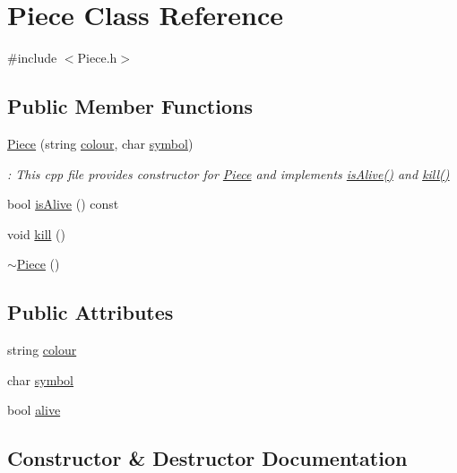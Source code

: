 \hypertarget{classPiece}{}\section{Piece Class Reference}
\label{classPiece}


{\ttfamily \#include $<$Piece.\+h$>$}

\subsection*{Public Member Functions}
\begin{DoxyCompactItemize}
\item 
\hyperlink{classPiece_ad9009085b915df6c20503f2ce144c931}{Piece} (string \hyperlink{classPiece_aa789cfb1749a0dc7ae40c20e369a4321}{colour}, char \hyperlink{classPiece_a00143ae55b69981ae484cc7521b6d81a}{symbol})
\begin{DoxyCompactList}\small\item\em \+: This cpp file provides constructor for \hyperlink{classPiece}{Piece} and implements \hyperlink{classPiece_ae6b1785f6356100873c0719be9bb4b90}{is\+Alive()} and \hyperlink{classPiece_a4c2ace5bc3eb68e46e8599702b782d94}{kill()} \end{DoxyCompactList}\item 
bool \hyperlink{classPiece_ae6b1785f6356100873c0719be9bb4b90}{is\+Alive} () const 
\item 
void \hyperlink{classPiece_a4c2ace5bc3eb68e46e8599702b782d94}{kill} ()
\item 
\hyperlink{classPiece_a5d7a4f6bade94cb33b6f634de8aa7918}{$\sim$\+Piece} ()
\end{DoxyCompactItemize}
\subsection*{Public Attributes}
\begin{DoxyCompactItemize}
\item 
string \hyperlink{classPiece_aa789cfb1749a0dc7ae40c20e369a4321}{colour}
\item 
char \hyperlink{classPiece_a00143ae55b69981ae484cc7521b6d81a}{symbol}
\item 
bool \hyperlink{classPiece_a8b3c2f812ead74ba513f521e63f767f9}{alive}
\end{DoxyCompactItemize}


\subsection{Constructor \& Destructor Documentation}
\hypertarget{classPiece_ad9009085b915df6c20503f2ce144c931}{}
